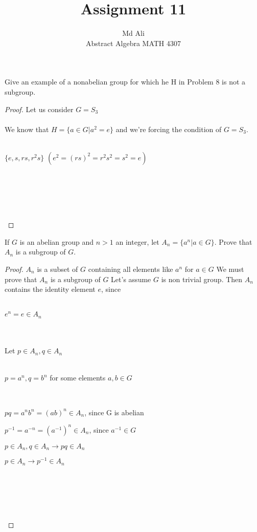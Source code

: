 \documentclass[12pt]{article}
\newenvironment{problem}[2][Problem]{\begin{trivlist}
\item[\hskip \labelsep {\bfseries #1}\hskip \labelsep {\bfseries #2.}]}{\end{trivlist}}
\begin{document}
 
 
\title{Assignment 11}%
\author{Md Ali\\ %
Abstract Algebra MATH 4307} %
 
\maketitle
 
\begin{problem}{2.3.9} %
Give an example of a nonabelian group for which he H in Problem 8 is not a subgroup.
\end{problem}
 
\begin{proof}
Let us consider $G=S_3$ \\ \\ 
We know that $H = \{ a \in G | a^2 = e\}$ and we're forcing the condition of $G=S_3$. \\ \\
\centerline{$ \{ e,s,rs,r^2s \}$ $(e^2 = (rs)^2 = r^2s^2=s^2=e)$} \\ \\
\centerline{} \\ \\
\end{proof}

\begin{problem}{2.3.10}
If $G$ is an abelian group and $n > 1$ an integer, let $A_n = \{ a^n | a \in G \}$. Prove that $A_n $ is a subgroup of $G$.
\end{problem}

\begin{proof}
$A_n$ is a subset of $G$ containing all elements like $a^n$ for $a \in G$ We must prove that $A_n$ is a subgroup of $G$ Let's assume $G$ is non trivial group. Then $A_n$ contains the identity element $e$, since \\ \\
\centerline{$e^n = e \in A_n$} \\ \\
Let $p \in A_n, q \in A_n$ \\ \\
\centerline{$p=a^n,q=b^n$ for some elements $a,b \in G$} \\
\centerline{$pq = a^nb^n = (ab)^n \in A_n$, since G is abelian}
\centerline{$p^{-1}=a^{-n}=(a^{-1})^n \in A_n$, since $a^{-1} \in G$}
\centerline{$p \in A_n, q \in A_n \rightarrow pq \in A_n$}
\centerline{$p \in A_n \rightarrow p^{-1} \in A_n$} \\ \\
\centerline{} \\ \\
\end{proof}
\end{document}
